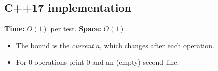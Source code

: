 \subsection*{C++17 implementation}

\begin{complexitybox}
\textbf{Time:} $O(1)$ per test. \textbf{Space:} $O(1)$.
\end{complexitybox}

\begin{pitfallbox}
\begin{itemize}
  \item The bound is the \emph{current} $a$, which changes after each
        operation.
  \item For $0$ operations print $0$ and an (empty) second line.
\end{itemize}
\end{pitfallbox}
